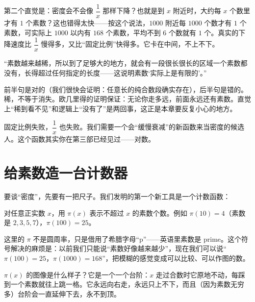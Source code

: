 第二个直觉是：密度会不会像 $\dfrac{1}{x}$ 那样下降？也就是到 $x$ 附近时，大约每 $x$ 个数里才有 $1$ 个素数？这也错得太快——按这个说法，$1000$ 附近每 $1000$ 个数才有 $1$ 个素数，可实际上 $1000$ 以内有 $168$ 个素数，平均不到 $6$ 个数就有 $1$ 个。真实的下降速度比 $\dfrac{1}{x}$ 慢得多，又比“固定比例”快得多。它卡在中间，不上不下。

\begin{fanli}
“素数越来越稀，所以到了足够大的地方，就会有一段很长很长的区域一个素数都没有，长得超过任何指定的长度——这说明素数‘实际上是有限的’。”

前半句是对的（我们很快会证明：任意长的纯合数段确实存在），后半句是错的。稀，不等于消失。欧几里得的证明保证：无论你走多远，前面永远还有素数。直觉上“稀到看不见”和逻辑上“没有了”是两回事，这正是本章要反复小心的地方。
\end{fanli}

固定比例失败，$\dfrac{1}{x}$ 也失败。我们需要一个会“缓慢衰减”的新函数来当密度的候选人。这个函数其实你在第三部已经见过——对数。

\section{给素数造一台计数器}

要谈“密度”，先要有一把尺子。我们发明的第一个新工具是一个计数函数：

\begin{dingyi}[素数计数函数]
对任意正实数 $x$，用 $\pi(x)$ 表示不超过 $x$ 的素数个数。例如 $\pi(10)=4$（素数是 $2,3,5,7$），$\pi(100)=25$。
\end{dingyi}

这里的 $\pi$ 不是圆周率，只是借用了希腊字母“p”——英语里素数是 prime。这个符号解决的麻烦是：以前我们只能说“素数好像越来越少”，现在我们可以说“$\pi(100)=25$，$\pi(1000)=168$”，把模糊的感觉变成可以比较、可以作图的数。

$\pi(x)$ 的图像是什么样子？它是一个一个台阶：$x$ 走过合数时它原地不动，每踩到一个素数就往上跳一格。它永远向右走，永远只上不下，而且（因为素数无穷多）台阶会一直延伸下去，永不到顶。

\begin{center}
\end{center}

